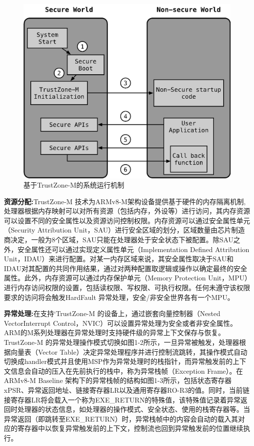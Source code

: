 \documentclass[12pt,a4paper]{ctexart}
\begin{document}
\begin{figure}[h]
    \centering
    \includegraphics[scale=0.5]{graph/2.png}
    \caption{基于TrustZone-M的系统运行机制}
\end{figure}
\par \textbf{资源分配:}TrustZone-M 技术为ARMv8-M架构设备提供基于硬件的内存隔离机制,处理器根据内存映射可以对所有资源（包括内存，外设等）进行访问，其内存资源可以设置不同的安全属性以及资源访问控制权限。内存资源可以通过安全属性单元（Security Attribution Unit，SAU）进行安全区域的划分，区域数量由芯片制造商决定，一般为8个区域，SAU只能在处理器处于安全状态下被配置。除SAU之外，安全属性还可以通过实现定义属性单元（Implementation Defined Attribution Unit，IDAU）来进行配置。对某一内存区域来说，其安全属性取决于SAU和IDAU对其配置的共同作用结果，通过对两种配置取逻辑或操作以确定最终的安全属性。此外，内存资源可以通过内存保护单元（Memory Protection Unit，MPU）进行内存访问权限的设置，包括读权限、写权限、可执行权限。任何未遵守该权限要求的访问将会触发HardFault 异常处理，安全/非安全世界各有一个MPU。
\par \textbf{异常处理:}在支持‘TrustZone-M 的设备上，通过嵌套向量控制器（Nested VectorInterrupt Control，NVIC）可以设置异常处理为安全或者非安全属性。ARM的M系列处理器在异常处理时支持硬件级的异常上下文保存与恢复。TrustZone-M 的异常处理操作模式切换如图1-2所示，一旦异常被触发，处理器根据向量表（Vector Table）决定异常处理程序并进行控制流跳转，其操作模式自动切换成handler模式并且使用MSP作为异常处理时的栈指针，而异常触发前的上下文信息会自动的压入在先前执行的栈中，称为异常栈帧（Exception Frame）。在ARMv8-M Baseline 架构下的异常栈帧的结构如图1-3所示，包括状态寄存器xPSR、异常返回地址、链接寄存器LR以及通用寄存器RO-R3的值。同时，当前链接寄存器LR将会载入一个称为EXE\_RETURN的特殊值，该特殊值记录着异常返回时处理器的状态信息，如处理器的操作模式、安全状态、使用的栈寄存器等。当异常返回（即跳转至EXE\_RETURN）时，异常栈帧中的内容会自动的载入其对应的寄存器中以恢复异常触发前的上下文，控制流也回到异常触发前的位置继续执行。
\end{document}
